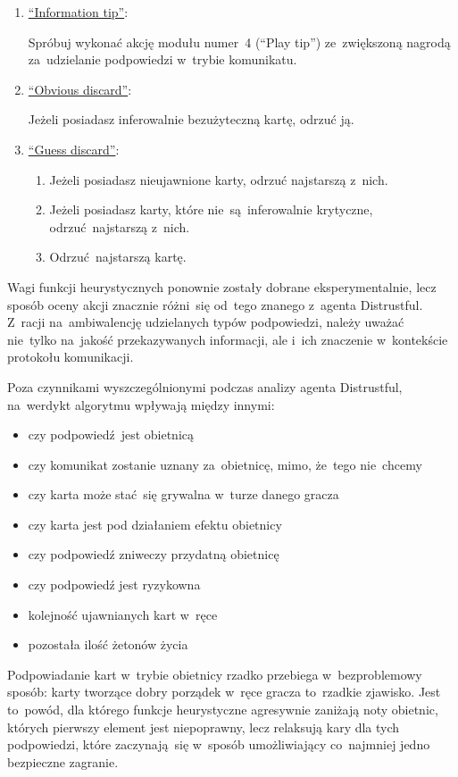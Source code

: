 \documentclass[declaration,shortabstract,inz]{iithesis}
\begin{document}
\begin{enumerate}
	\item \underline{``Information tip''}:
	
	Spróbuj wykonać akcję modułu numer~4 (``Play tip'') ze~zwiększoną nagrodą za~udzielanie podpowiedzi w~trybie komunikatu.
	
	\item \underline{``Obvious discard''}:
	
	Jeżeli posiadasz inferowalnie bezużyteczną kartę, odrzuć ją.

	\item \underline{``Guess discard''}:
	\begin{enumerate}
		\item Jeżeli posiadasz nieujawnione karty, odrzuć najstarszą z~nich.
		\item Jeżeli posiadasz karty, które nie~są~inferowalnie krytyczne, odrzuć najstarszą z~nich.
		\item Odrzuć najstarszą kartę.
	\end{enumerate}

\end{enumerate}

Wagi funkcji heurystycznych ponownie zostały dobrane eksperymentalnie, lecz sposób oceny akcji znacznie różni~się od~tego znanego z~agenta Distrustful. Z~racji na~ambiwalencję udzielanych typów podpowiedzi, należy uważać nie~tylko na~jakość przekazywanych informacji, ale i~ich znaczenie w~kontekście protokołu komunikacji.

Poza czynnikami wyszczególnionymi podczas analizy agenta Distrustful, na~werdykt algorytmu wpływają między innymi:

\begin{itemize}
	\item czy podpowiedź jest obietnicą
	\item czy komunikat zostanie uznany za~obietnicę, mimo, że~tego nie~chcemy
	\item czy karta może stać~się grywalna w~turze danego gracza
	\item czy karta jest pod działaniem efektu obietnicy
	\item czy podpowiedź zniweczy przydatną obietnicę
	\item czy podpowiedź jest ryzykowna
	\item kolejność ujawnianych kart w~ręce
	\item pozostała ilość żetonów życia
\end{itemize}

Podpowiadanie kart w~trybie obietnicy rzadko przebiega w~bezproblemowy sposób: karty tworzące dobry porządek w~ręce gracza to~rzadkie zjawisko. Jest to~powód, dla którego funkcje heurystyczne agresywnie zaniżają noty obietnic, których pierwszy element jest niepoprawny, lecz relaksują kary dla tych podpowiedzi, które zaczynają~się w~sposób umożliwiający co~najmniej jedno bezpieczne zagranie.
\end{document}
